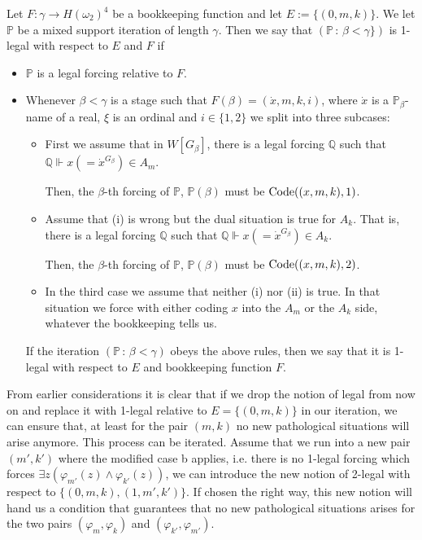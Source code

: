 \documentclass[a4paper,11pt]{article}
\newcommand{\forceP}{\mathbb{P}}
\newcommand{\forceQ}{\mathbb{Q}}
\begin{document}
Let $F: \gamma \rightarrow H(\omega_2)^4$ be a bookkeeping function and let $E:=\{ (0,m,k) \}$. We let $\forceP$ be a mixed support iteration of length $ \gamma$. Then we say that $(\forceP  \,  : \, \beta < \gamma\} ) $ is 1-legal with respect to $E$ and $F$ if
\begin{itemize}
\item $\forceP$ is a legal forcing relative to $F$.
\item Whenever $\beta < \gamma$ is a stage such that $F(\beta)=(\dot{x},m,k,i)$, where $\dot{x}$ is a $\forceP_{\beta}$-name of a real, $\xi$ is an ordinal and $i \in \{1,2 \}$ we split into three subcases:
\begin{itemize}
\item[(i)] First we assume that in $W[G_{\beta}]$,
there is a legal forcing $\forceQ$ such that $\forceQ \Vdash x (=\dot{x}^{G_{\beta}}) \in A_m$.

Then, the $\beta$-th forcing of $\forceP$, $\forceP(\beta)$ must be $\hbox{Code} ((x,m,k), 1)$.
\item[(ii)]
Assume that (i) is wrong but the dual situation is true for $A_k$. That is, 
there is a legal forcing $\forceQ$ such that $\forceQ \Vdash x (=\dot{x}^{G_{\beta}}) \in A_k$.


Then, the $\beta$-th forcing of $\forceP$, $\forceP(\beta)$ must be $\hbox{Code} ((x,m,k), 2)$.
\item[(iii)]

In the third case  we assume that neither (i) nor (ii) is true.
In that situation we force with either coding $x$ into the $A_m$ or the $A_k$ side, whatever the bookkeeping tells us.



\end{itemize}

If the iteration  $(\forceP \, : \, \beta < \gamma)$ obeys the above rules, then we say that it is 1-legal with respect to $E$ and bookkeeping function $F$.
\end{itemize}

From earlier considerations it is clear that if we drop the notion of legal from now on and replace it with 1-legal relative to $E=\{ (0,m,k)\}$ in our iteration,  we can ensure that, at least for the pair $(m,k)$ no new pathological situations will arise anymore.
This process can be iterated. Assume that we run into a new pair $(m',k')$ where the modified case b applies, i.e. there is no 1-legal forcing which forces $\exists z (\varphi_{m'}(z) \land\varphi_{k'} (z))$, we can introduce the new notion of 2-legal with respect to $\{(0,m,k) , (1,m',k')\}$. If chosen the right way, this new notion will hand us a condition that guarantees that no new pathological situations arises for the two pairs $(\varphi_m,\varphi_k)$ and $(\varphi_{k'}, \varphi_{m'})$. 
\end{document}
